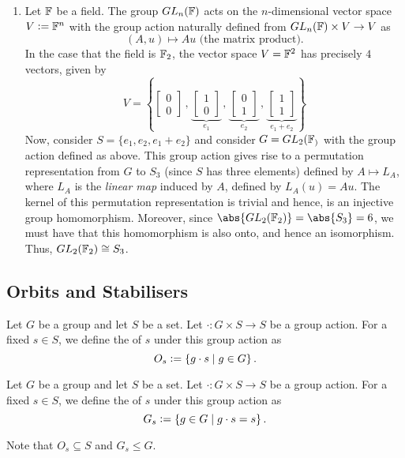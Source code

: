 \begin{exe}
\begin{enumerate}
        \item Let $\mathbb{F}$ be a field. The group $GL_n(\mathbb{F})$ acts on the $n$-dimensional vector space $V \vcentcolon= \mathbb{F}^n$ with the group action naturally defined from $GL_n(\mathbb{F}) \times V \to V$ as 
        \[
            (A, u) \mapsto Au \text{ (the matrix product).}
        \]
        In the case that the field is $\mathbb{F}_2$, the vector space $V = \mathbb{F}^2$ has precisely $4$ vectors, given by
        \[
            V = \left\{ \begin{bmatrix}
            0 \\ 0
            \end{bmatrix} \, , \, \underbrace{\begin{bmatrix}
            1 \\ 0
            \end{bmatrix}}_{e_1}\, , \, \underbrace{\begin{bmatrix}
            0 \\ 1
            \end{bmatrix}}_{e_2}\, , \, \underbrace{\begin{bmatrix}
            1 \\ 1
            \end{bmatrix}}_{e_1+e_2} \right\}
        \]
        Now, consider $S = \{ e_1, e_2, e_1+e_2\}$ and consider $G = GL_2(\mathbb{F}_)$ with the group action defined as above. This group action gives rise to a permutation representation from $G$ to $S_3$ (since $S$ has three elements) defined by $A \mapsto L_A$, where $L_A$ is the \emph{linear map} induced by $A$, defined by $L_A(u) = Au$. The kernel of this permutation representation is trivial and hence, is an injective group homomorphism. Moreover, since $\abs{GL_2(\F_2)} = \abs{S_3} = 6$, we must have that this homomorphism is also onto, and hence an isomorphism. Thus, $GL_2(\mathbb{F}_2) \cong S_3$.
    \end{enumerate}
\end{exe}

\subsection{Orbits and Stabilisers}

\begin{defn}
    Let $G$ be a group and let $S$ be a set. Let $\cdot \colon G \times S \to S$ be a group action. For a fixed $s \in S$, we define the  of $s$ under this group action as
    \[
        O_s \vcentcolon= \left\{ g \cdot s \mid g \in G \right\}.
    \]
\end{defn}
\begin{defn}
    Let $G$ be a group and let $S$ be a set. Let $\cdot \colon G \times S \to S$ be a group action. For a fixed $s \in S$, we define the  of $s$ under this group action as
    \[
        G_s \vcentcolon= \left\{ g \in G \mid g \cdot s = s \right\}.
    \]
\end{defn}
Note that $O_s \subseteq S$ and $G_s \leq G$. 

